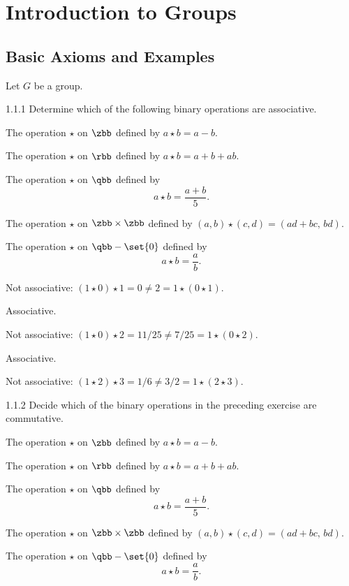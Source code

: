 \section{Introduction to Groups}

\subsection{Basic Axioms and Examples}

Let $G$ be a group.

\begin{exercise}{1.1.1}
    Determine which of the following binary operations are associative.
    \begin{subexercises}
        \item The operation $\star$ on $\zbb$ defined by $a \star b = a - b$.
        \item The operation $\star$ on $\rbb$ defined by $a \star b = a + b + ab$.
        \item The operation $\star$ on $\qbb$ defined by
        \[
        	a \star b = \dfrac{a + b}{5}.
        \]
        \item The operation $\star$ on $\zbb \times \zbb$ defined by $(a,b) \star (c,d) = (ad + bc, \, bd)$.
        \item The operation $\star$ on $\qbb - \set{0}$ defined by
        \[
        	a \star b = \dfrac{a}{b}.
        \]
    \end{subexercises}
\end{exercise}

\begin{solenum}
    \item Not associative: $(1 \star 0) \star 1 = 0 \neq 2 = 1 \star (0 \star 1)$.
    \item Associative.
    \item Not associative: $(1 \star 0) \star 2 = 11/25 \neq 7/25 = 1 \star (0 \star 2)$.
    \item Associative.
    \item Not associative: $(1 \star 2) \star 3 = 1/6 \neq 3/2 = 1 \star (2 \star 3)$.
\end{solenum}

\begin{exercise}{1.1.2}
    Decide which of the binary operations in the preceding exercise are commutative.
    \begin{subexercises}
        \item The operation $\star$ on $\zbb$ defined by $a \star b = a - b$.
        \item The operation $\star$ on $\rbb$ defined by $a \star b = a + b + ab$.
        \item The operation $\star$ on $\qbb$ defined by
        \[
        	a \star b = \dfrac{a + b}{5}.
        \]
        \item The operation $\star$ on $\zbb \times \zbb$ defined by $(a,b) \star (c,d) = (ad + bc, \, bd)$.
        \item The operation $\star$ on $\qbb - \set{0}$ defined by
        \[
        	a \star b = \dfrac{a}{b}.
        \]
    \end{subexercises}
\end{exercise}

